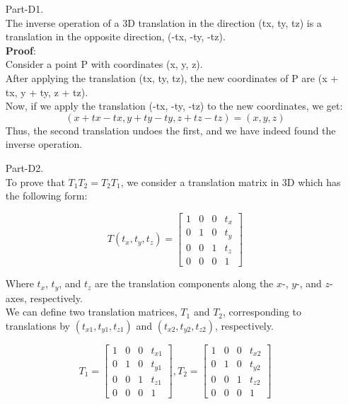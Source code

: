 \documentclass[12pt]{report}
\begin{document}
\begin{enumerate}
    \item[Part-D1.]
    \ \\
    The inverse operation of a 3D translation in the direction (tx, ty, tz) is a translation in the opposite direction, (-tx, -ty, -tz).\\
    \textbf{Proof}:\\
    Consider a point P with coordinates (x, y, z). \\
    After applying the translation (tx, ty, tz), the new coordinates of P are (x + tx, y + ty, z + tz). \\
    Now, if we apply the translation (-tx, -ty, -tz) to the new coordinates, we get:
    $$
    (x + tx - tx, y + ty - ty, z + tz - tz) = (x, y, z)
    $$
    Thus, the second translation undoes the first, and we have indeed found the inverse operation.

    \item[Part-D2.]
    \ \\
    To prove that $T_1 T_2 = T_2 T_1$, we consider a translation matrix in 3D which has the following form:

    \[
    T(t_x, t_y, t_z) = 
    \begin{bmatrix}
    1 & 0 & 0 & t_x \\
    0 & 1 & 0 & t_y \\
    0 & 0 & 1 & t_z \\
    0 & 0 & 0 & 1
    \end{bmatrix}
    \]

    Where \(t_x\), \(t_y\), and \(t_z\) are the translation components along the \(x\)-, \(y\)-, and \(z\)-axes, respectively. \\
    We can define two translation matrices, \(T_1\) and \(T_2\), corresponding to translations by \((t_{x1}, t_{y1}, t_{z1})\) and 
    \((t_{x2}, t_{y2}, t_{z2})\), respectively.

    $$
    T_1 =
    \begin{bmatrix}
    1 & 0 & 0 & t_{x1} \\
    0 & 1 & 0 & t_{y1} \\
    0 & 0 & 1 & t_{z1} \\
    0 & 0 & 0 & 1
    \end{bmatrix},
    T_2 =
    \begin{bmatrix}
    1 & 0 & 0 & t_{x2} \\
    0 & 1 & 0 & t_{y2} \\
    0 & 0 & 1 & t_{z2} \\
    0 & 0 & 0 & 1
    \end{bmatrix}
    $$


\end{enumerate}
\end{document}
